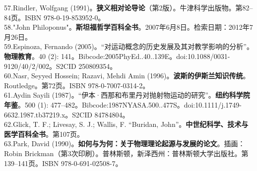 57.Rindler, Wolfgang (1991)。\textbf{狭义相对论导论}（第2版）。牛津科学出版物。第82–84页。ISBN 978-0-19-853952-0。\\
58."John Philoponus"。\textbf{斯坦福哲学百科全书}。2007年6月8日。检索日期：2012年7月26日。\\
59.Espinoza, Fernando (2005)。“对运动概念的历史发展及其对教学影响的分析”。\textbf{物理教育}。40 (2): 141。Bibcode:2005PhyEd..40..139E。doi:10.1088/0031-9120/40/2/002。S2CID 250809354。\\
60.Nasr, Seyyed Hossein; Razavi, Mehdi Amin (1996)。\textbf{波斯的伊斯兰知识传统}。Routledge。第72页。ISBN 978-0-7007-0314-2。\\
61.Aydin Sayili (1987)。“伊本·西那和布里丹对抛射物运动的研究”。\textbf{纽约科学院年鉴}。500 (1): 477–482。Bibcode:1987NYASA.500..477S。doi:10.1111/j.1749-6632.1987.tb37219.x。S2CID 84784804。\\
62.Glick, T. F.; Livesay, S. J.; Wallis, F. “Buridan, John”。\textbf{中世纪科学、技术与医学百科全书}。第107页。\\
63.Park, David (1990)。\textbf{如何与为何：关于物理理论起源与发展的论文}。插画：Robin Brickman（第3次印刷）。普林斯顿，新泽西州：普林斯顿大学出版社。第139–141页。ISBN 978-0-691-02508-7。\\
